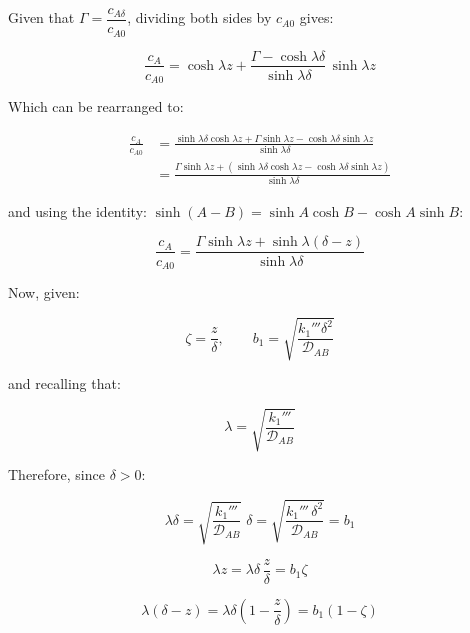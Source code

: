 \documentclass[letterpaper,12pt]{article}
\begin{document}
Given that $\Gamma = \dfrac{c_{A \delta}}{c_{A0}}$, dividing both sides by $c_{A0}$ gives:

\begin{equation}
    \frac{c_A}{c_{A0}} = \cosh\lambda z + \frac{\Gamma - \cosh\lambda\delta}{\sinh\lambda\delta}\,\sinh\lambda z
\end{equation}

Which can be rearranged to:

\begin{equation}
\begin{aligned}
    \frac{c_A}{c_{A0}} &= \frac{\sinh\lambda\delta\cosh\lambda z + \Gamma\sinh\lambda z - \cosh\lambda\delta\sinh\lambda z}{\sinh\lambda\delta} \\
                       &= \frac{\Gamma\sinh\lambda z + \left(\sinh\lambda\delta\cosh\lambda z - \cosh\lambda\delta\sinh\lambda z\right)}{\sinh\lambda\delta}
\end{aligned}
\end{equation}

and using the identity: $\sinh{(A - B)} = \sinh{A}\cosh{B} - \cosh{A}\sinh{B}$:

\begin{equation}
    \frac{c_A}{c_{A0}} = \frac{\Gamma\sinh\lambda z + \sinh\lambda(\delta - z)}{\sinh\lambda\delta}
\end{equation}

Now, given:

\begin{equation}
    \zeta = \frac{z}{\delta}, \qquad b_1 = \sqrt{\frac{k_1''' \delta^2}{\mathcal{D}_{AB}}}
\end{equation}

and recalling that:

\begin{equation}
    \lambda = \sqrt{\frac{k_1'''}{\mathcal{D}_{AB}}}
\end{equation}

Therefore, since $\delta > 0$:

\begin{equation}
    \lambda\delta = \sqrt{\frac{k_1'''}{\mathcal{D}_{AB}}}\;\delta = \sqrt{\frac{k_1'''\,\delta^2}{\mathcal{D}_{AB}}} = b_1
\end{equation}

\begin{equation}
    \lambda z = \lambda\delta\,\frac{z}{\delta} = b_1\zeta
\end{equation}

\begin{equation}
    \lambda(\delta - z) = \lambda\delta\left(1 - \frac{z}{\delta}\right) = b_1(1 - \zeta)
\end{equation}
\end{document}
